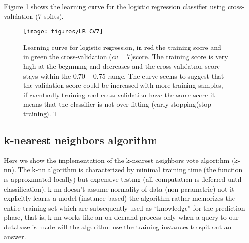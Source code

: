 \documentclass[11pt]{article}
\theoremstyle{definition}
\theoremstyle{remark}
\begin{document}
Figure \ref{fig:lr-cv7} shows the learning curve for the logistic regression classifier using cross-validation (7 splits).
\begin{figure}[H]
        \centering
        \texttt{[image: figures/LR-CV7]}
        \caption{Learning curve for logistic regression, in red the training score and in green the cross-validation ($cv=7$)score. The training score is very high at the beginning and decreases and the cross-validation score stays within the $0.70-0.75$ range. The curve seems to suggest that the validation score could be increased with more training samples, if eventually training and cross-validation have the same score it means that the classifier is not over-fitting (early stopping(stop training). T
        } \label{fig:lr-cv7}
\end{figure}


\subsection{k-nearest neighbors algorithm}
\label{se:reskneighbors}
Here we show the implementation of the k-nearest neighbors vote algorithm (k-nn). The k-nn algorithm is characterized by minimal training time (the function is approximated locally) but expensive testing (all computation is deferred until classification).
k-nn doesn't assume normality of data (non-parametric) not it explicitly learns a model (instance-based) the algorithm rather memorizes the entire training set which are subsequently used as “knowledge” for the prediction phase, that is, k-nn works like an on-demand process only when a query to our database is made will the algorithm use the training instances to spit out an answer. 
\end{document}
